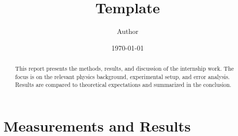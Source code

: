 \documentclass{article}
\numberwithin{equation}{section}
\numberwithin{algorithm}{section}
\begin{document}

\title{Template}
\author{Author}
\date{\today}
\maketitle

\clearpage

\begin{abstract}
This report presents the methods, results, and discussion of the internship work.
The focus is on the relevant physics background, experimental setup, and error
analysis. Results are compared to theoretical expectations and summarized in the
conclusion.
\end{abstract}
\clearpage

\setcounter{tocdepth}{2}
\tableofcontents

\clearpage





\section{Measurements and Results}








\printbibliography


\end{document}

